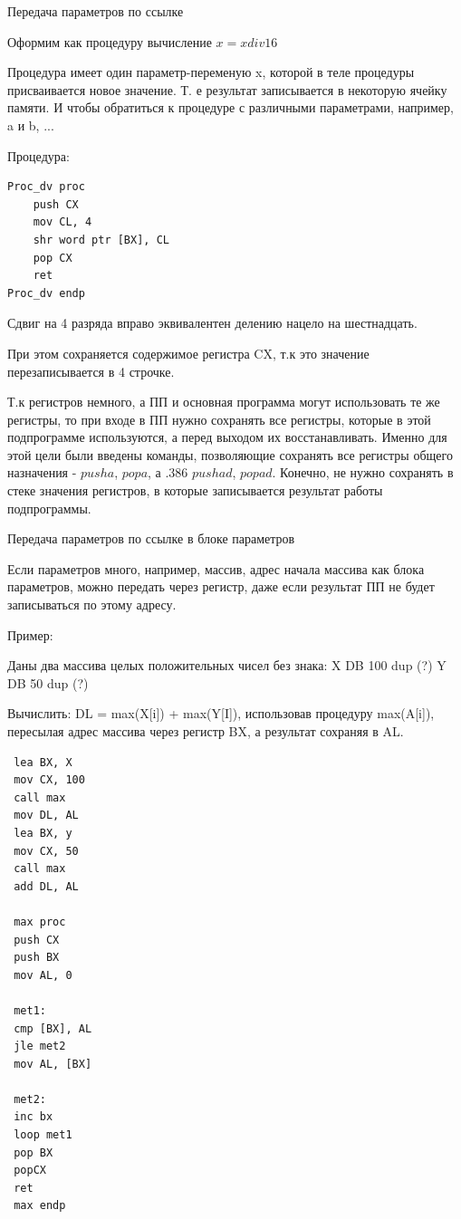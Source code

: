 Передача параметров по ссылке

Оформим как процедуру вычисление $x = x div 16$

Процедура имеет один параметр-переменую x, которой в теле
процедуры присваивается новое значение. Т. е результат записывается
в некоторую ячейку памяти. И чтобы обратиться к процедуре с различными параметрами, например, a и b, ...


Процедура:

\begin{verbatim}
Proc_dv proc
	push CX
	mov CL, 4
	shr word ptr [BX], CL
	pop CX
	ret
Proc_dv endp
\end{verbatim}

Сдвиг на 4 разряда вправо эквивалентен делению нацело на шестнадцать.

При этом сохраняется содержимое регистра CX, т.к это значение перезаписывается в 4 строчке.

Т.к регистров немного, а ПП и основная программа могут использовать те же регистры, то при входе в ПП нужно сохранять все регистры, которые в этой подпрограмме используются, а перед выходом их восстанавливать. Именно для этой цели были введены команды, позволяющие сохранять все регистры общего назначения - $pusha$, $popa$, а .386 $pushad$, $popad$. Конечно, не нужно сохранять в стеке значения регистров, в которые записывается результат работы подпрограммы.

Передача параметров по ссылке в блоке параметров

Если параметров много, например, массив, адрес начала массива как блока параметров, можно передать через регистр, даже если результат ПП не будет записываться по этому адресу.

Пример:

Даны два массива целых положительных чисел без знака:
X DB 100 dup (?)
Y DB 50 dup (?)

Вычислить: DL = max(X[i]) + max(Y[I]), использовав процедуру max(A[i]), пересылая адрес массива через регистр BX,	а результат сохраняя в AL.

\begin{verbatim}
 lea BX, X
 mov CX, 100
 call max
 mov DL, AL
 lea BX, y
 mov CX, 50
 call max
 add DL, AL
 
 max proc
 push CX
 push BX
 mov AL, 0
 
 met1:
 cmp [BX], AL
 jle met2
 mov AL, [BX]
 
 met2:
 inc bx
 loop met1
 pop BX
 popCX
 ret
 max endp
\end{verbatim}

